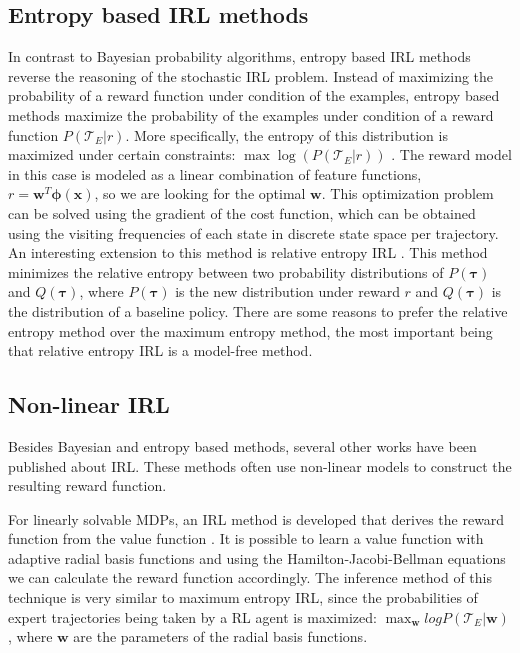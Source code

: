 \documentclass[mscThesis.tex]{subfiles}
\begin{document}
\subsection{Entropy based IRL methods}
In contrast to Bayesian probability algorithms, entropy based IRL methods reverse the reasoning of the stochastic IRL problem. Instead of maximizing the probability of a reward function under condition of the examples, entropy based methods maximize the probability of the examples under condition of a reward function $P(\mathcal{T}_E | r)$. More specifically, the entropy of this distribution is maximized under certain constraints: $\max \log (P(\mathcal{T}_E | r))$ \cite{Ziebart2008}. The reward model in this case is modeled as a linear combination of feature functions, $r = \bm{w}^T \bm{\phi}(\bm{x})$, so we are looking for the optimal $\bm{w}$. This optimization problem can be solved using the gradient of the cost function, which can be obtained using the visiting frequencies of each state in discrete state space per trajectory. An interesting extension to this method is relative entropy IRL \cite{Boularias2011}. This method minimizes the relative entropy between two probability distributions of $P(\bm{\tau})$ and $Q(\bm{\tau})$, where $P(\bm{\tau})$ is the new distribution under reward $r$ and $Q(\bm{\tau})$ is the distribution of a baseline policy. There are some reasons to prefer the relative entropy method over the maximum entropy method, the most important being that relative entropy IRL is a model-free method.

\subsection{Non-linear IRL}
Besides Bayesian and entropy based methods, several other works have been published about IRL. These methods often use non-linear models to construct the resulting reward function. 

For linearly solvable MDPs, an IRL method is developed that derives the reward function from the value function \cite{dvijotham2010inverse}. It is possible to learn a value function with adaptive radial basis functions and using the Hamilton-Jacobi-Bellman equations we can calculate the reward function accordingly. The inference method of this technique is very similar to maximum entropy IRL, since the probabilities of expert trajectories being taken by a RL agent is maximized: $\max_{\bm{w}} log P(\mathcal{T}_E | \bm{w})$, where $\bm{w}$ are the parameters of the radial basis functions. 
\end{document}

